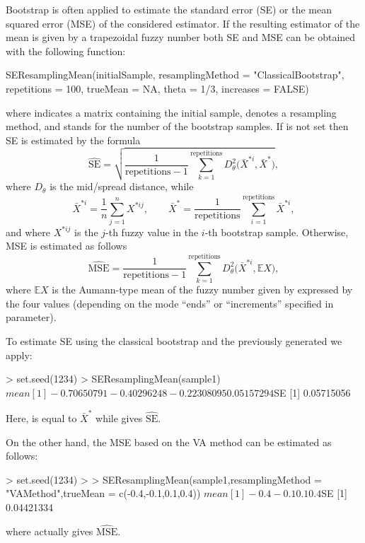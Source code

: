 Bootstrap is often applied to estimate the standard error (SE) or the mean squared error (MSE) of the considered estimator.  If the resulting estimator of the mean is given by a trapezoidal fuzzy number both SE and MSE can be obtained with the following function:
\begin{example}
SEResamplingMean(initialSample, resamplingMethod = "ClassicalBootstrap",
  repetitions = 100, trueMean = NA, theta = 1/3, increases = FALSE)
\end{example}
where  indicates a matrix containing the initial sample,  denotes a resampling method, and  stands for the number of the bootstrap samples.
If  is not set then SE is estimated by the formula
\begin{equation}
\label{frachetse}
	\widehat{\mathrm{SE}}=\sqrt{\frac{1}{\text{repetitions}-1} \sum_{k=1}^{\text{repetitions}} D^2_{\theta} \Big( \bar{X}^{*i}, \bar{X}^{*}\Big)} ,
\end{equation}
where $D_{\theta}$ is the mid/spread distance, while
\begin{equation}
	\bar{X}^{*i} = \frac{1}{n} \sum_{j=1}^{n} X^{*ij}, \qquad \bar{X}^{*} = \frac{1}{\text{repetitions}} \sum_{i=1}^{\text{repetitions}} \bar{X}^{*i},
\end{equation}
and where $X^{*ij}$ is the $j$-th fuzzy value in the $i$-th bootstrap sample.
Otherwise, MSE is estimated as follows
\begin{equation}
\label{frachetmse}
	\widehat{\mathrm{MSE}}=\frac{1}{\text{repetitions}-1} \sum_{k=1}^{\text{repetitions}} D^2_{\theta} \Big( \bar{X}^{*i}, \mathbb{E}X\Big) ,
\end{equation}
where $\mathbb{E}X$ is the Aumann-type mean \citep{puri1986} of the fuzzy number given by  expressed by the four values (depending on the mode ``ends'' or ``increments'' specified in  parameter).

To estimate SE using the classical bootstrap and the previously generated  we apply:
\begin{example}
> set.seed(1234)
> SEResamplingMean(sample1)
$mean
[1] -0.70650791 -0.40296248 -0.22308095  0.05157294

$SE
[1] 0.05715056 
\end{example}
\noindent Here,  is equal to $\bar{X}^{*}$ while  gives $\widehat{\mathrm{SE}}$.

On the other hand, the MSE based on the VA method can be estimated as follows:
\begin{example}
> set.seed(1234)
> 
> SEResamplingMean(sample1,resamplingMethod = "VAMethod",trueMean = c(-0.4,-0.1,0.1,0.4))
$mean
[1] -0.4 -0.1  0.1  0.4

$SE
[1] 0.04421334
\end{example}
\noindent where  actually gives $\widehat{\mathrm{MSE}}$.


